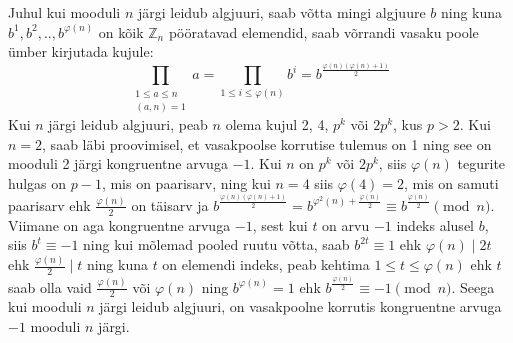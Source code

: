 \documentclass[a4paper, 10pt]{article}
\newcommand{\Z}{\mathbb{Z}}
\begin{document}
\bigskip
Juhul kui mooduli $n$ järgi leidub algjuuri, saab võtta mingi algjuure $b$ ning kuna $b^1, b^2,.., b^{\varphi(n)}$ on kõik $\Z_n$ pööratavad elemendid, saab võrrandi vasaku poole ümber kirjutada kujule: $$\prod\limits_{\substack{1\leq a \leq n\\(a,n)=1}}a=\prod\limits_{1\leq i \leq \varphi(n)}b^i=b^{\frac{\varphi(n)(\varphi(n)+1)}{2}}$$ Kui $n$ järgi leidub algjuuri, peab $n$ olema kujul 2, 4, $p^k$ või $2p^k$, kus $p>2$. Kui $n=2$, saab läbi proovimisel, et vasakpoolse korrutise tulemus on 1 ning see on mooduli 2 järgi kongruentne arvuga $-1$. Kui $n$ on $p^k$ või $2p^k$, siis $\varphi(n)$ tegurite hulgas on $p-1$, mis on paarisarv, ning kui $n=4$ siis $\varphi(4)=2$, mis on samuti paarisarv ehk $\frac{\varphi(n)}2$ on täisarv ja $b^{\frac{\varphi(n)(\varphi(n)+1)}{2}}=b^{\varphi^2(n)+\frac{\varphi(n)}{2}}\equiv b^{\frac{\varphi(n)}{2}}\pmod n$. Viimane on aga kongruentne arvuga $-1$, sest kui $t$ on arvu $-1$ indeks alusel $b$, siis $b^t\equiv-1$ ning kui mõlemad pooled ruutu võtta, saab $b^{2t}\equiv1$ ehk $\varphi(n)\mid2t$ ehk $\frac{\varphi(n)}{2}\mid t$ ning kuna $t$ on elemendi indeks, peab kehtima $1\leq t\leq\varphi(n)$ ehk $t$ saab olla vaid $\frac{\varphi(n)}{2}$ või $\varphi(n)$ ning $b^{\varphi(n)}=1$ ehk $b^{\frac{\varphi(n)}{2}}\equiv-1\pmod n$. Seega kui mooduli $n$ järgi leidub algjuuri, on vasakpoolne korrutis kongruentne arvuga $-1$ mooduli $n$ järgi.
\end{document}
